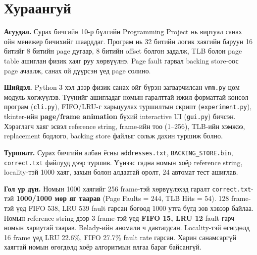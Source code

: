 

\setcounter{tocdepth}{2}

{\setlength{\parskip}{1pt}\tableofcontents}
\clearpage

\section*{Хураангуй}
\textbf{Асуудал.} Сурах бичгийн 10-р бүлгийн Programming Project нь виртуал санах ойн менежер бичихийг шаарддаг. Програм нь 32 битийн логик хаягийн баруун 16 битийг 8 битийн page дугаар, 8 битийн offset болгон задалж, TLB болон page table ашиглан физик хаяг руу хөрвүүлнэ. Page fault гарвал backing store-оос page ачаалж, санах ой дүүрсэн үед page солино.

\textbf{Шийдэл.} Python 3 хэл дээр физик санах ойг бүрэн загварчилсан \texttt{vmm.py} цөм модуль хөгжүүлэв. Түүнийг ашигладаг номын гаралттай ижил форматтай консол програм (\texttt{cli.py}), FIFO/LRU-г харьцуулах туршилтын скрипт (\texttt{experiment.py}), tkinter-ийн \textbf{page/frame animation} бүхий interactive UI (\texttt{gui.py}) бичсэн. Хэрэглэгч хаяг эсвэл reference string, frame-ийн тоо (1–256), TLB-ийн хэмжээ, replacement бодлого, backing store файлыг сольж дахин туршиж болно.

\textbf{Туршилт.} Сурах бичгийн албан ёсны \texttt{addresses.txt}, \texttt{BACKING\_STORE.bin}, \texttt{correct.txt} файлууд дээр туршив. Үүнээс гадна номын хоёр reference string, locality-тэй 1000 хаяг, захын болон алдаатай оролт, 24 автомат тест ашиглав.

\textbf{Гол үр дүн.} Номын 1000 хаягийг 256 frame-тэй хөрвүүлэхэд гаралт \texttt{correct.txt}-тэй \textbf{1000/1000 мөр яг таарав} (Page Faults = 244, TLB Hits = 54). 128 frame-тэй үед FIFO 538, LRU 539 fault гарсан бөгөөд 1000 утга бүгд зөв хэвээр байлаа. Номын reference string дээр 3 frame-тэй үед \textbf{FIFO 15, LRU 12} fault гарч номын хариутай таарав. Belady-ийн аномали ч давтагдсан. Locality-тэй өгөгдөлд 16 frame үед LRU 22.6\%, FIFO 27.7\% fault rate гарсан. Харин санамсаргүй хаягтай номын өгөгдөлд хоёр алгоритмын ялгаа бараг байсангүй.

